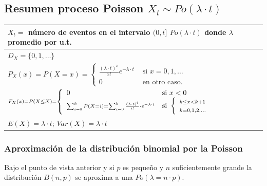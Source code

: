 \documentclass[
  letterpaper,
  DIV=11,
  numbers=noendperiod]{scrreprt}
\begin{document}
\subsection{\texorpdfstring{Resumen proceso Poisson
\(X_t\sim Po(\lambda\cdot t)\)}{Resumen proceso Poisson X\_t\textbackslash sim Po(\textbackslash lambda\textbackslash cdot t)}}\label{resumen-proceso-poisson-x_tsim-polambdacdot-t}

\renewcommand{\arraystretch}{1.75}
\begin{table}
\centering
\begin{tabular}{|l|}
\hline\rowcolor{LightBlue}
$X_t=$ número de eventos en el intervalo $(0,t]$ $Po(\lambda\cdot t)$ donde $\lambda$ promedio por u.t. 
\\\hline
$D_X=\{0,1,\ldots \}$ \\\hline
$P_X(x)=P(X=x)=\left\{\begin{array}{ll} \frac{(\lambda\cdot t)^x}{x!}e^{-\lambda\cdot t} & \mbox{ si } x=0,1,\ldots\\ 0 & \mbox{ en otro caso.}\end{array}\right.$\\\hline
$\scriptstyle F_X(x)=P(X\leq X)=\left\{\begin{array}{ll} 0 & \mbox{si } x<0\\\displaystyle\scriptstyle\sum_{i=0}^{k} P(X=i)= \displaystyle\scriptstyle\sum_{i=0}^{k} \frac{(\lambda\cdot t)^i}{i!}\cdot e^{-\lambda\cdot t} & \mbox{si }\left\{\begin{array}{l}\scriptstyle k\leq x< k+1\\\scriptstyle k=0,1,2,\ldots\end{array}\right.\end{array}\right.$

 \\\hline
$E(X)=\lambda\cdot t$; $Var(X)=\lambda\cdot t$\\\hline
\end{tabular}
\end{table}

\subsubsection{Aproximación de la distribución binomial por la
Poisson}\label{aproximaciuxf3n-de-la-distribuciuxf3n-binomial-por-la-poisson}

Bajo el punto de vista anterior y si \(p\) es pequeño y \(n\)
suficientemente grande la distribución \(B(n,p)\) se aproxima a una
\(Po(\lambda=n\cdot p)\).
\end{document}
